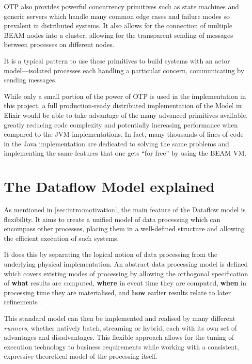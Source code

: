 OTP also provides powerful concurrency primitives such as state machines and generic servers which handle many common edge cases and failure modes so prevalent in distributed systems.
It also allows for the connection of multiple BEAM nodes into a cluster, allowing for the transparent sending of messages between processes on different nodes.

It is a typical pattern to use these primitives to build systems with an actor model---isolated processes each handling a particular concern, communicating by sending messages.

While only a small portion of the power of OTP is used in the implementation in this project, a full production-ready distributed implementation of the Model in Elixir would be able to take advantage of the many advanced primitives available, greatly reducing code complexity and potentially increasing performance when compared to the JVM implementations.
In fact, many thousands of lines of code in the Java implementation are dedicated to solving the same problems and implementing the same features that one gets ``for free'' by using the BEAM VM.

\section{The Dataflow Model explained}\label{sec:prep:dataflow}

As mentioned in \cref{sec:intro:motivation}, the main feature of the Dataflow model is flexibility.
It aims to create a unified model of data processing which can encompass other processes, placing them in a well-defined structure and allowing the efficient execution of such systems.

It does this by separating the logical notion of data processing from the underlying physical implementation.
An abstract data processing model is defined which covers existing modes of processing by allowing the orthogonal specification of \textbf{what} results are computed, \textbf{where} in event time they are computed, \textbf{when} in processing time they are materialised, and \textbf{how} earlier results relate to later refinements \cite[p.~1793]{Akidau:2015}.

This standard model can then be implemented and realised by many different \emph{runners}, whether natively batch, streaming or hybrid, each with its own set of advantages and disadvantages. 
This flexible approach allows for the tuning of execution technology to business requirements while working with a consistent, expressive theoretical model of the processing itself.

